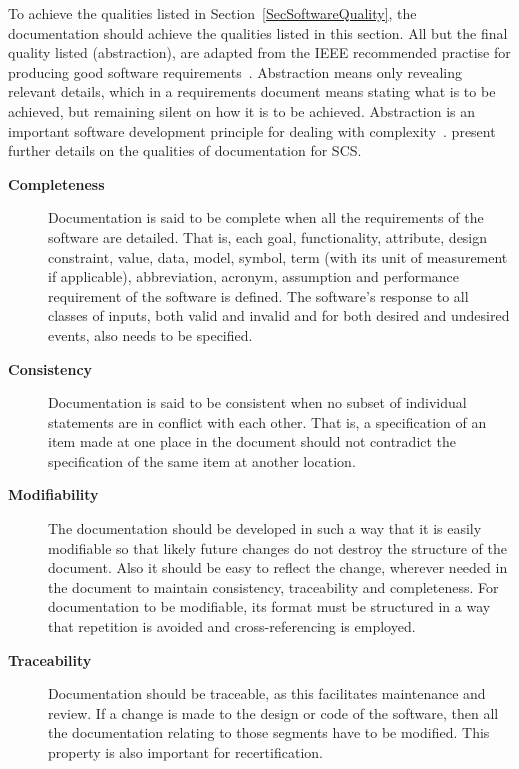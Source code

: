 \documentclass[12pt]{article}
\begin{document}
To achieve the qualities listed in Section~\ref{SecSoftwareQuality}, the
documentation should achieve the qualities listed in this section.  All but the
final quality listed (abstraction), are adapted from the IEEE recommended
practise for producing good software requirements~\cite{IEEE1998}.  Abstraction
means only revealing relevant details, which in a requirements document means
stating what is to be achieved, but remaining silent on how it is to be
achieved.  Abstraction is an important software development principle for
dealing with complexity~\cite[p.~40]{GhezziEtAl2003}.
\citet{SmithAndKoothoor2016} present further details on the qualities of
documentation for SCS.

\begin{description}

\item [\textbf{Completeness}] Documentation is said to be complete when all the
  requirements of the software are detailed. That is, each goal, functionality,
  attribute, design constraint, value, data, model, symbol, term (with its unit
  of measurement if applicable), abbreviation, acronym, assumption and
  performance requirement of the software is defined.  The software's response
  to all classes of inputs, both valid and invalid and for both desired and
  undesired events, also needs to be specified.

\item [\textbf{Consistency}] Documentation is said to be consistent when no subset
  of individual statements are in conflict with each other. That is, a
  specification of an item made at one place in the document should not
  contradict the specification of the same item at another location.

\item [\textbf{Modifiability}] The documentation should be developed in such a way
  that it is easily modifiable so that likely future changes do not destroy the
  structure of the document. Also it should be easy to reflect the change,
  wherever needed in the document to maintain consistency, traceability and
  completeness. For documentation to be modifiable, its format must be
  structured in a way that repetition is avoided and cross-referencing is
  employed.

\item [\textbf{Traceability}] Documentation should be traceable, as this
  facilitates maintenance and review. If a change is made to the design or code
  of the software, then all the documentation relating to those segments have to
  be modified.  This property is also important for recertification.


\end{description}
\end{document}
